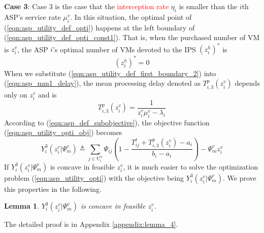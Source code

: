 \documentclass[10pt,journal, compsoc]{IEEEtran}
\newtheorem{lemma}{Lemma}
\begin{document}
\textbf{Case 3}: Case 3 is the case that the \textcolor{red}{interception rate} $\eta_i$ is smaller than the $i$th ASP's service rate $\mu_i^v$. In this situation, the optimal point of (\ref{eqn:asp_utility_def_opti}) happens at the left boundary of (\ref{eqn:asp_utility_def_opti_const1}). That is, when the purchased number of VM is $z_i^v$, the ASP $i$'s optimal number of VMs devoted to the IPS $(z_i^h)^*$ is
\begin{equation} \label{eqn:asp_utility_def_first_boundary_2}
(z_i^h)^* = 0
\end{equation}
When we substitute (\ref{eqn:asp_utility_def_first_boundary_2}) into (\ref{eqn:asp_mm1_delay}), the mean processing delay denoted as $T_{i,3}^p(z_i^v)$ depends only on $z_i^v$ and is
\begin{equation}\label{eqn:asp_case3_mm1_delay}
T_{i,3}^p(z_i^v) = \frac{1}{z_i^v \mu_i^v-\lambda_i}
\end{equation}
According to %
(\ref{eqn:asp_def_subobjective}), the objective function (\ref{eqn:asp_utility_opti_obj}) becomes
\begin{equation}\label{eqn:asp_case3_objective}
Y_i^3(z_i^v|\Psi_m^v) \triangleq \sum_{j \in \mathrm{U}_i^n}\Psi_{ij}(1-\frac{T_{ij}^t + T_{i,3}^p(z_i^v)-a_i}{b_i-a_i}) - \Psi_m^vz_i^v
\end{equation}
If $Y_i^3(z_i^v|\Psi_m^v)$ is concave in feasible $z_i^v$, it is much easier to solve the optimization problem (\ref{eqn:asp_utility_opti}) with the objective being $Y_i^3(z_i^v|\Psi_m^v)$. We prove this properties in the following.
\begin{lemma} \label{lemma:asp_case3_utility_concave}
$Y_i^3(z_i^v|\Psi_m^v)$ is concave in feasible $z_i^v$.
\end{lemma}
The detailed proof is in Appendix \ref{appendix:lemma_4}.
\end{document}
